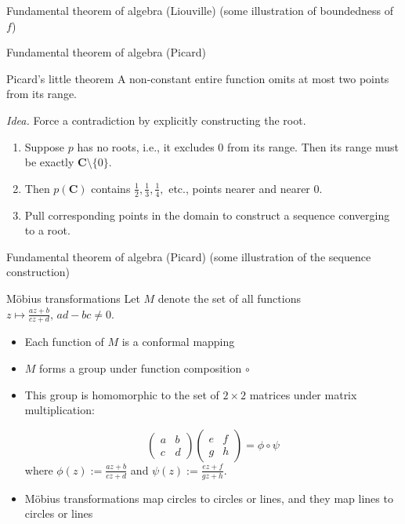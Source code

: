 \documentclass{beamer}
\begin{document}
\begin{frame}[t]{Fundamental theorem of algebra (Liouville)} \vspace{4pt}
(some illustration of boundedness of \(f\))
\end{frame}

\begin{frame}[t]{Fundamental theorem of algebra (Picard)} \vspace{4pt}
\begin{block}{Picard's little theorem}
A non-constant entire function omits at most two points from its range.
\end{block}
\textit{Idea.} Force a contradiction by explicitly constructing the root.
\begin{enumerate}
	\item Suppose \(p\) has no roots, i.e., it excludes \(0\) from its range. Then its range must be exactly \(\mathbf{C} \setminus \{0\}\).
	\item Then \(p(\mathbf{C})\) contains \(\frac{1}{2}, \frac{1}{3}, \frac{1}{4},\) etc., points nearer and nearer \(0\).
	\item Pull corresponding points in the domain to construct a sequence converging to a root.
\end{enumerate}
\end{frame}

\begin{frame}[t]{Fundamental theorem of algebra (Picard)} \vspace{4pt}
(some illustration of the sequence construction)
\end{frame}

\begin{frame}[t]{M\"{o}bius transformations} \vspace{4pt}
Let \(M\) denote the set of all functions \(z \mapsto \frac{az + b}{cz + d}, \, ad - bc \ne 0\).
\begin{itemize}
	\item Each function of \(M\) is a conformal mapping
	\item \(M\) forms a group under function composition \(\circ\)
	\item This group is homomorphic to the set of \(2 \times 2\) matrices under matrix multiplication:

	\begin{equation*}
		\begin{pmatrix}a & b \\ c & d\end{pmatrix} \begin{pmatrix}e & f \\ g & h\end{pmatrix} = \phi \circ \psi
	\end{equation*}
	where \(\phi(z) := \frac{az + b}{cz + d}\) and \(\psi(z) := \frac{ez + f}{gz + h}\).
	\item M\"{o}bius transformations map circles to circles or lines, and they map lines to circles or lines
\end{itemize}
\end{frame}
\end{document}
